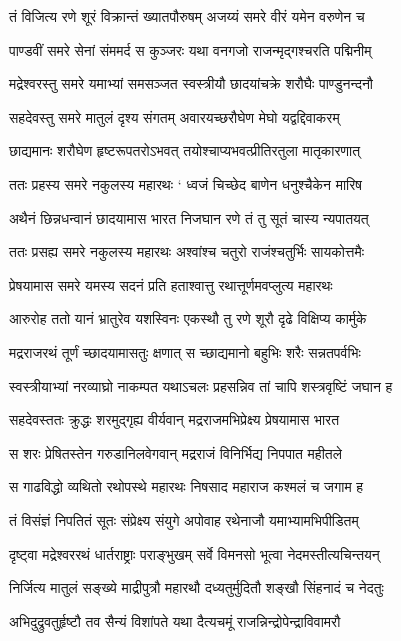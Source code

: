 \twolineshloka
{तं विजित्य रणे शूरं विक्रान्तं ख्यातपौरुषम्}
{अजय्यं समरे वीरं यमेन वरुणेन च}


\twolineshloka
{पाण्डवीं समरे सेनां संममर्द स कुञ्जरः}
{यथा वनगजो राजन्मृद्गश्चरति पद्मिनीम्}


\twolineshloka
{मद्रेश्वरस्तु समरे यमाभ्यां समसञ्जत}
{स्वस्त्रीयौ छादयांचक्रे शरौघैः पाण्डुनन्दनौ}


\twolineshloka
{सहदेवस्तु समरे मातुलं दृश्य संगतम्}
{अवारयच्छरौघेण मेघो यद्वद्दिवाकरम्}


\twolineshloka
{छाद्यमानः शरौघेण हृष्टरूपतरोऽभवत्}
{तयोश्चाप्यभवत्प्रीतिरतुला मातृकारणात्}


\twolineshloka
{ततः प्रहस्य समरे नकुलस्य महारथः}
{` ध्वजं चिच्छेद बाणेन धनुश्चैकेन मारिष}


\twolineshloka
{अथैनं छिन्नधन्वानं छादयामास भारत}
{निजघान रणे तं तु सूतं चास्य न्यपातयत्}


\twolineshloka
{ततः प्रसह्य समरे नकुलस्य महारथः}
{अश्वांश्च चतुरो राजंश्चतुर्भिः सायकोत्तमैः}


\twolineshloka
{प्रेषयामास समरे यमस्य सदनं प्रति}
{हताश्वात्तु रथात्तूर्णमवप्लुत्य महारथः}


\twolineshloka
{आरुरोह ततो यानं भ्रातुरेव यशस्विनः}
{एकस्थौ तु रणे शूरौ दृढे विक्षिप्य कार्मुके}


\twolineshloka
{मद्रराजरथं तूर्णं च्छादयामासतुः क्षणात्}
{स च्छाद्यमानो बहुभिः शरैः सन्नतपर्वभिः}


\twolineshloka
{स्वस्त्रीयाभ्यां नरव्याघ्रो नाकम्पत यथाऽचलः}
{प्रहसन्निव तां चापि शस्त्रवृष्टिं जघान ह}


\twolineshloka
{सहदेवस्ततः क्रुद्धः शरमुद्गृह्य वीर्यवान्}
{मद्रराजमभिप्रेक्ष्य प्रेषयामास भारत}


\twolineshloka
{स शरः प्रेषितस्तेन गरुडानिलवेगवान्}
{मद्रराजं विनिर्भिद्य निपपात महीतले}


\twolineshloka
{स गाढविद्धो व्यथितो रथोपस्थे महारथः}
{निषसाद महाराज कश्मलं च जगाम ह}


\twolineshloka
{तं विसंज्ञं निपतितं सूतः संप्रेक्ष्य संयुगे}
{अपोवाह रथेनाजौ यमाभ्यामभिपीडितम्}


\twolineshloka
{दृष्ट्वा मद्रेश्वररथं धार्तराष्ट्राः पराङ्भुखम्}
{सर्वे विमनसो भूत्वा नेदमस्तीत्यचिन्तयन्}


\twolineshloka
{निर्जित्य मातुलं सङ्ख्ये माद्रीपुत्रौ महारथौ}
{दध्यतुर्मुदितौ शङ्खौ सिंहनादं च नेदतुः}


\twolineshloka
{अभिदुद्रुवतुर्हृष्टौ तव सैन्यं विशांपते}
{यथा दैत्यचमूं राजन्निन्द्रोपेन्द्राविवामरौ}


